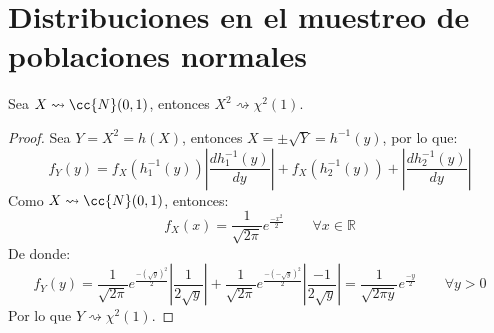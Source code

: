 \section{Distribuciones en el muestreo de poblaciones normales}
\begin{prop}
    Sea $X\rightsquigarrow\cc{N}(0,1)$, entonces $X^2\rightsquigarrow \chi^2(1)$.
    \begin{proof}
        Sea $Y = X^2 = h(X)$, entonces $X = \pm \sqrt{Y} = h^{-1}(y)$, por lo que:
        \begin{equation*}
            f_Y(y) = f_X(h_1^{-1}(y)) \left|\dfrac{dh_1^{-1}(y)}{dy}\right| + f_X(h_2^{-1}(y)) + \left|\dfrac{dh_2^{-1}(y)}{dy}\right| 
        \end{equation*}
        Como $X\rightsquigarrow \cc{N}(0,1)$, entonces:
        \begin{equation*}
            f_X(x) = \dfrac{1}{\sqrt{2\pi}} e^{\frac{-x^2}{2}} \qquad \forall x\in \mathbb{R}
        \end{equation*}
        De donde:
        \begin{equation*}
            f_Y(y) = \dfrac{1}{\sqrt{2\pi}} e^{\frac{-{(\sqrt{y})}^{2}}{2}} \left|\dfrac{1}{2\sqrt{y}}\right| + \dfrac{1}{\sqrt{2\pi}} e^{\frac{-{(-\sqrt{y})}^{2}}{2}} \left|\dfrac{-1}{2\sqrt{y}}\right|  = \dfrac{1}{\sqrt{2\pi y}} e^{\frac{-y}{2}} \qquad \forall y>0
        \end{equation*}
        Por lo que $Y\rightsquigarrow\chi^2(1)$.
    \end{proof}
\end{prop}
